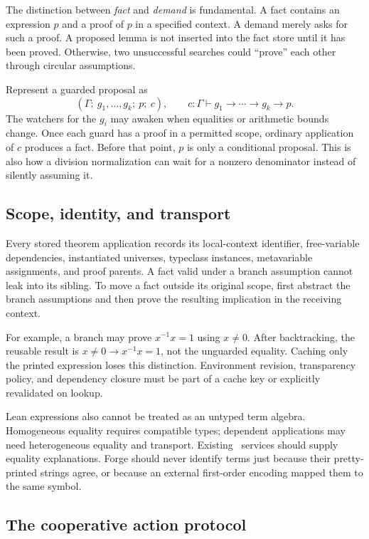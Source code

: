 The distinction between \emph{fact} and \emph{demand} is fundamental. A fact
contains an expression $p$ and a proof of $p$ in a specified context. A demand
merely asks for such a proof. A proposed lemma is not inserted into the fact
store until it has been proved. Otherwise, two unsuccessful searches could
``prove'' each other through circular assumptions.

Represent a guarded proposal as
\[
 (\Gamma;\ g_1,\ldots,g_k;\ p;\ c),
 \qquad c:\Gamma\vdash g_1\to\cdots\to g_k\to p.
\]
The watchers for the $g_i$ may awaken when equalities or arithmetic bounds
change. Once each guard has a proof in a permitted scope, ordinary application
of $c$ produces a fact. Before that point, $p$ is only a conditional proposal.
This is also how a division normalization can wait for a nonzero denominator
instead of silently assuming it.

\subsection{Scope, identity, and transport}

Every stored theorem application records its local-context identifier,
free-variable dependencies, instantiated universes, typeclass instances,
metavariable assignments, and proof parents. A fact valid under a branch
assumption cannot leak into its sibling. To move a fact outside its original
scope, first abstract the branch assumptions and then prove the resulting
implication in the receiving context.

For example, a branch may prove $x^{-1}x=1$ using $x\ne0$. After backtracking,
the reusable result is $x\ne0\to x^{-1}x=1$, not the unguarded equality.
Caching only the printed expression loses this distinction. Environment
revision, transparency policy, and dependency closure must be part of a cache
key or explicitly revalidated on lookup.

Lean expressions also cannot be treated as an untyped term algebra.
Homogeneous equality requires compatible types; dependent applications may
need heterogeneous equality and transport. Existing \grind\ services should
supply equality explanations. Forge should never identify terms just because
their pretty-printed strings agree, or because an external first-order encoding
mapped them to the same symbol.

\subsection{The cooperative action protocol}

